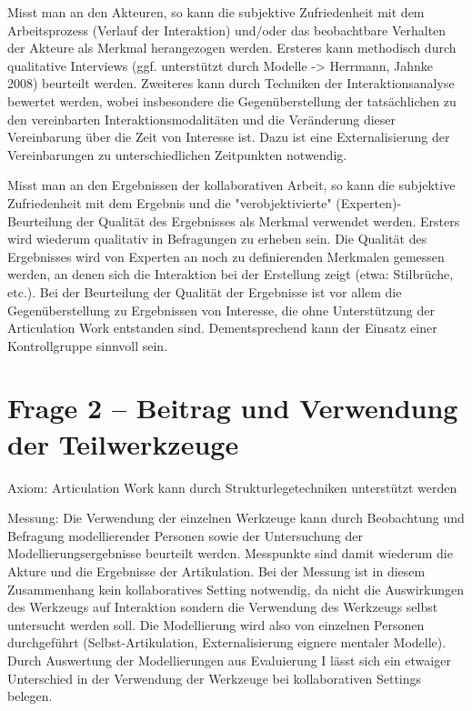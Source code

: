 Misst man an den Akteuren, so kann die subjektive Zufriedenheit mit dem Arbeitsprozess (Verlauf der Interaktion) und/oder das beobachtbare Verhalten der Akteure als Merkmal herangezogen werden. Ersteres kann methodisch durch qualitative Interviews (ggf. unterstützt durch Modelle -> Herrmann, Jahnke 2008) beurteilt werden. Zweiteres kann durch Techniken der Interaktionsanalyse bewertet werden, wobei insbesondere die Gegenüberstellung der tatsächlichen zu den vereinbarten Interaktionsmodalitäten und die Veränderung dieser Vereinbarung über die Zeit von Interesse ist. Dazu ist eine Externalisierung der Vereinbarungen zu unterschiedlichen Zeitpunkten notwendig. 

Misst man an den Ergebnissen der kollaborativen Arbeit, so kann die subjektive Zufriedenheit mit dem Ergebnis und die "verobjektivierte" (Experten)-Beurteilung der Qualität des Ergebnisses als Merkmal verwendet werden. Ersters wird wiederum qualitativ in Befragungen zu erheben sein. Die Qualität des Ergebnisses wird von Experten an noch zu definierenden Merkmalen gemessen werden, an denen sich die Interaktion bei der Erstellung zeigt (etwa: Stilbrüche, etc.). Bei der Beurteilung der Qualität der Ergebnisse ist vor allem die Gegenüberstellung zu Ergebnissen von Interesse, die ohne Unterstützung der Articulation Work entstanden sind. Dementsprechend kann der Einsatz einer Kontrollgruppe sinnvoll sein.

\section{Frage 2 – Beitrag und Verwendung der Teilwerkzeuge} %
\label{sec:frage_2_beitrag_und_verwendung_der_teilwerkzeuge}

Axiom: Articulation Work kann durch Strukturlegetechniken unterstützt werden

Messung:
Die Verwendung der einzelnen Werkzeuge kann durch Beobachtung und Befragung modellierender Personen sowie der Untersuchung der Modellierungsergebnisse beurteilt werden. Messpunkte sind damit wiederum die Akture und die Ergebnisse der Artikulation. Bei der Messung ist in diesem Zusammenhang kein kollaboratives Setting notwendig, da nicht die Auswirkungen des Werkzeugs auf Interaktion sondern die Verwendung des Werkzeugs selbst untersucht werden soll. Die Modellierung wird also von einzelnen Personen durchgeführt (Selbst-Artikulation, Externalisierung eignere mentaler Modelle). Durch Auswertung der Modellierungen aus Evaluierung I lässt sich ein etwaiger Unterschied in der Verwendung der Werkzeuge bei kollaborativen Settings belegen.

